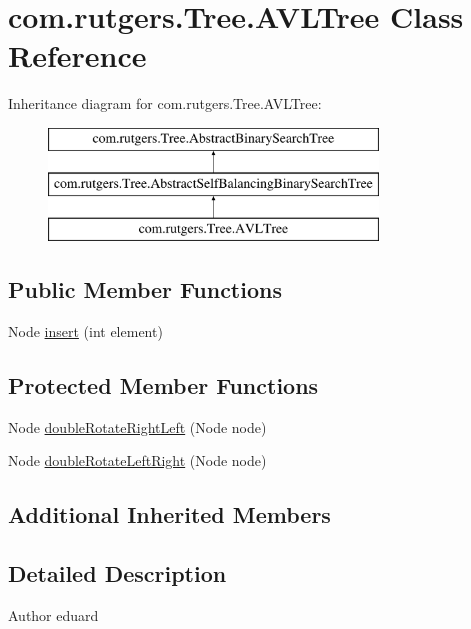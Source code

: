 \hypertarget{classcom_1_1rutgers_1_1Tree_1_1AVLTree}{}\section{com.\+rutgers.\+Tree.\+A\+V\+L\+Tree Class Reference}
\label{classcom_1_1rutgers_1_1Tree_1_1AVLTree}
Inheritance diagram for com.\+rutgers.\+Tree.\+A\+V\+L\+Tree\+:\begin{figure}[H]
\begin{center}
\leavevmode
\includegraphics[height=3.000000cm]{classcom_1_1rutgers_1_1Tree_1_1AVLTree}
\end{center}
\end{figure}
\subsection*{Public Member Functions}
\begin{DoxyCompactItemize}
\item 
Node \hyperlink{classcom_1_1rutgers_1_1Tree_1_1AVLTree_a2e0affe74d21a5b18195bac35dde2c06}{insert} (int element)
\end{DoxyCompactItemize}
\subsection*{Protected Member Functions}
\begin{DoxyCompactItemize}
\item 
Node \hyperlink{classcom_1_1rutgers_1_1Tree_1_1AVLTree_a869d4b4c54c71b37d3ac01574f021d90}{double\+Rotate\+Right\+Left} (Node node)
\item 
Node \hyperlink{classcom_1_1rutgers_1_1Tree_1_1AVLTree_a553beb2d927eaca460d22bfa5ce7a337}{double\+Rotate\+Left\+Right} (Node node)
\end{DoxyCompactItemize}
\subsection*{Additional Inherited Members}


\subsection{Detailed Description}
\begin{DoxyAuthor}{Author}
eduard 
\end{DoxyAuthor}


